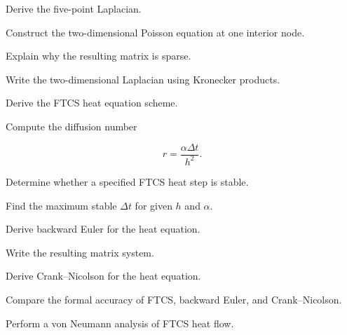 \begin{exercise}[3]
Derive the five-point Laplacian.
\end{exercise}

\begin{exercise}[3]
Construct the two-dimensional Poisson equation at one interior node.
\end{exercise}

\begin{exercise}[3]
Explain why the resulting matrix is sparse.
\end{exercise}

\begin{exercise}[3]
Write the two-dimensional Laplacian using Kronecker products.
\end{exercise}

\begin{exercise}[2]
Derive the FTCS heat equation scheme.
\end{exercise}

\begin{exercise}[2]
Compute the diffusion number

\[
r
=
\frac{
\alpha\Delta t
}{
h^2
}.
\]
\end{exercise}

\begin{exercise}[3]
Determine whether a specified FTCS heat step is stable.
\end{exercise}

\begin{exercise}[3]
Find the maximum stable \(\Delta t\) for given \(h\) and \(\alpha\).
\end{exercise}

\begin{exercise}[3]
Derive backward Euler for the heat equation.
\end{exercise}

\begin{exercise}[3]
Write the resulting matrix system.
\end{exercise}

\begin{exercise}[3]
Derive Crank--Nicolson for the heat equation.
\end{exercise}

\begin{exercise}[3]
Compare the formal accuracy of FTCS, backward Euler, and
Crank--Nicolson.
\end{exercise}

\begin{exercise}[3]
Perform a von Neumann analysis of FTCS heat flow.
\end{exercise}

